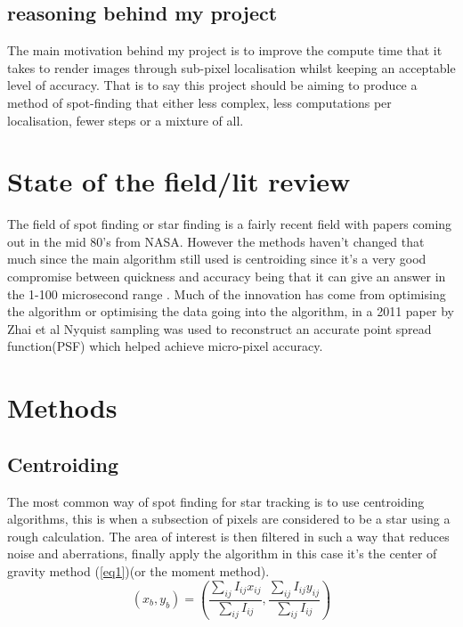\documentclass[aps,pra,a4paper,nofootinbib,onecolumn,tightenlines,longbibliography,12pt,amsfonts,amssymb,amsmath,floatfix]{revtex4-2} %
\begin{document}
  
  \subsection{reasoning behind my project} %
  \label{sub:reasoning behind my project}
  
  The main motivation behind my project is to improve the compute time that it
  takes to render images through sub-pixel localisation whilst keeping an
  acceptable level of accuracy. That is to say this project should be aiming to
  produce a method of spot-finding that either less complex, less computations
  per localisation, fewer steps or a mixture of all.
  



\section{State of the field/lit review} %
\label{sec:State of the field/lit review}


The field of spot finding or star finding is a fairly recent field with papers
coming out in the mid 80's from NASA. However the methods haven't changed that
much since the main algorithm still used is centroiding since it's a very good
compromise between quickness and accuracy being that it can give an answer in
the 1-100 microsecond range \cite{delabie2014accurate}. Much of the innovation
has come from optimising the algorithm or optimising the data going into the
algorithm, in a 2011 paper by Zhai et al\cite{zhai2011micro} Nyquist sampling
was used to reconstruct an accurate point spread function(PSF) which helped
achieve micro-pixel accuracy.


\section{Methods} %
\label{sec:Background}

  \subsection{Centroiding} %
  \label{sub:Centroiding_meth}
  
  
  
  The most common way of spot finding for star tracking is to use centroiding
  algorithms, this is when a subsection of pixels are considered to be a star
  using a rough calculation. The area of interest is then filtered in such a way
  that reduces noise and aberrations, finally apply the algorithm in this case
  it's the center of gravity method (\ref{eq1})(or the moment
  method)\cite{delabie2014accurate}\cite{stone1989comparison}.
  \begin{equation}\label{eq1}
      (x_b,y_b) = \left( {\frac{\sum_{ij} I_{ij}x_{ij}}{\sum_{ij} I_{ij}},\frac{\sum_{ij} I_{ij}y_{ij}}{\sum_{ij} I_{ij}}}\right)
  \end{equation}
  
\end{document}
